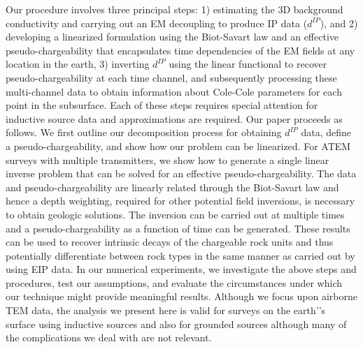 \documentclass[extra,mreferee]{gji}
\newcommand{\dip}{d^{IP}}
\begin{document}
Our procedure involves three principal steps: 1) estimating the 3D background conductivity and carrying out an EM decoupling to produce IP data ($\dip$), and 2) developing a linearized formulation using the Biot-Savart law and an effective pseudo-chargeability that encapsulates time dependencies of the EM fields at any location in the earth, 3) inverting $\dip$ using the linear functional to recover pseudo-chargeability at each time channel, and subsequently processing these multi-channel data to obtain information about Cole-Cole parameters for each point in the subsurface. Each of these steps requires special attention  for inductive source data and approximations are required. Our paper proceeds as follows. We first outline our decomposition process for obtaining $\dip$ data, define a pseudo-chargeability, and  show how our problem can be linearized. For ATEM surveys with multiple transmitters, we show how to generate a single linear inverse problem that can be solved for an effective pseudo-chargeability. The data and  pseudo-chargeability are linearly related through the Biot-Savart law and hence a depth weighting, required for other potential field inversions, is necessary to obtain geologic solutions. The inversion can be carried out at multiple times and a pseudo-chargeability as a function of time can be generated. These results can be used to recover intrinsic decays of the chargeable rock units and thus potentially differentiate between rock types in the same manner as carried out by \cite{Yuval1997} using EIP data. In our numerical experiments, we investigate the above steps and procedures, test our assumptions, and evaluate the circumstances under which our technique might provide meaningful results. Although  we focus upon airborne TEM data, the analysis we present here is valid for surveys on the earth’'s surface using inductive sources and also for grounded sources although many of the complications we deal with are not relevant. 
    
\end{document}
